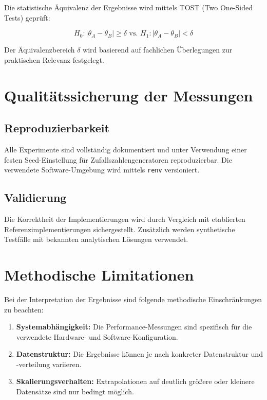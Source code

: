 \documentclass[
  ngerman,
  10pt,
  letterpaper,
]{book}
\begin{document}
Die statistische Äquivalenz der Ergebnisse wird mittels TOST (Two
One-Sided Tests) geprüft:

\[H_0: |\theta_A - \theta_B| \geq \delta \text{ vs. } H_1: |\theta_A - \theta_B| < \delta\]

Der Äquivalenzbereich \(\delta\) wird basierend auf fachlichen
Überlegungen zur praktischen Relevanz festgelegt.

\section{Qualitätssicherung der
Messungen}\label{qualituxe4tssicherung-der-messungen}

\subsection{Reproduzierbarkeit}\label{reproduzierbarkeit}

Alle Experimente sind vollständig dokumentiert und unter Verwendung
einer festen Seed-Einstellung für Zufallszahlengeneratoren
reproduzierbar. Die verwendete Software-Umgebung wird mittels
\texttt{renv} versioniert.

\subsection{Validierung}\label{validierung}

Die Korrektheit der Implementierungen wird durch Vergleich mit
etablierten Referenzimplementierungen sichergestellt. Zusätzlich werden
synthetische Testfälle mit bekannten analytischen Lösungen verwendet.

\section{Methodische Limitationen}\label{methodische-limitationen}

Bei der Interpretation der Ergebnisse sind folgende methodische
Einschränkungen zu beachten:

\begin{enumerate}
\def\labelenumi{\arabic{enumi}.}
\item
  \textbf{Systemabhängigkeit:} Die Performance-Messungen sind spezifisch
  für die verwendete Hardware- und Software-Konfiguration.
\item
  \textbf{Datenstruktur:} Die Ergebnisse können je nach konkreter
  Datenstruktur und -verteilung variieren.
\item
  \textbf{Skalierungsverhalten:} Extrapolationen auf deutlich größere
  oder kleinere Datensätze sind nur bedingt möglich.
\end{enumerate}
\end{document}
